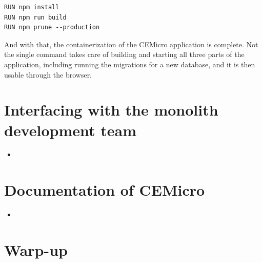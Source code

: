 \begin{lstlisting}
RUN npm install
RUN npm run build
RUN npm prune --production
\end{lstlisting}

And with that, the containerization of the CEMicro application is complete. Not the single command  takes care of building and starting all three parts of the application, including running the migrations for a new database, and it is then usable through the browser.


\section{Interfacing with the monolith development team}

\begin{itemize}
  \item {}
\end{itemize}







\section{Documentation of CEMicro}

\begin{itemize}
  \item {}
\end{itemize}

\section{Warp-up}
